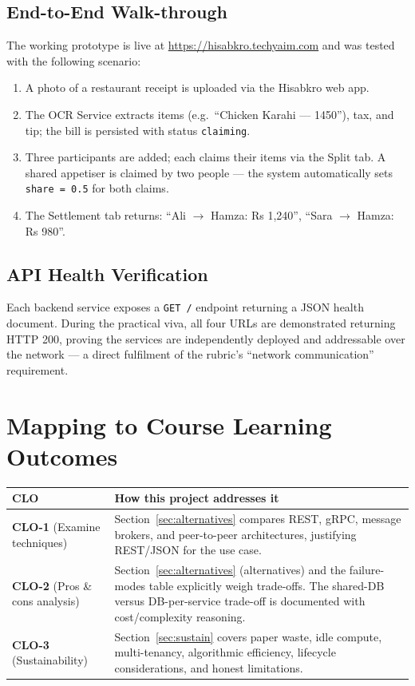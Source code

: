 \documentclass[11pt, a4paper]{article}
\begin{document}
\subsection{End-to-End Walk-through}

The working prototype is live at \url{https://hisabkro.techyaim.com} and was tested with the following scenario:

\begin{enumerate}[leftmargin=*]
\item A photo of a restaurant receipt is uploaded via the Hisabkro web app.
\item The OCR Service extracts items (e.g.\ ``Chicken Karahi --- 1450''), tax, and tip; the bill is persisted with status \texttt{claiming}.
\item Three participants are added; each claims their items via the Split tab. A shared appetiser is claimed by two people --- the system automatically sets \texttt{share = 0.5} for both claims.
\item The Settlement tab returns: ``Ali $\rightarrow$ Hamza: Rs 1,240'', ``Sara $\rightarrow$ Hamza: Rs 980''.
\end{enumerate}

\subsection{API Health Verification}

Each backend service exposes a \texttt{GET /} endpoint returning a JSON health document. During the practical viva, all four URLs are demonstrated returning HTTP 200, proving the services are independently deployed and addressable over the network --- a direct fulfilment of the rubric's ``network communication'' requirement.

\section{Mapping to Course Learning Outcomes}
\label{sec:clo}

\begin{table}[h!]
\centering
\begin{tabularx}{\textwidth}{l X}
\toprule
\textbf{CLO} & \textbf{How this project addresses it} \\
\midrule
\textbf{CLO-1} (Examine techniques)
& Section~\ref{sec:alternatives} compares REST, gRPC, message brokers, and peer-to-peer architectures, justifying REST/JSON for the use case. \\
\addlinespace
\textbf{CLO-2} (Pros \& cons analysis)
& Section~\ref{sec:alternatives} (alternatives) and the failure-modes table explicitly weigh trade-offs. The shared-DB versus DB-per-service trade-off is documented with cost/complexity reasoning. \\
\addlinespace
\textbf{CLO-3} (Sustainability)
& Section~\ref{sec:sustain} covers paper waste, idle compute, multi-tenancy, algorithmic efficiency, lifecycle considerations, and honest limitations. \\
\bottomrule
\end{tabularx}
\end{table}
\end{document}
